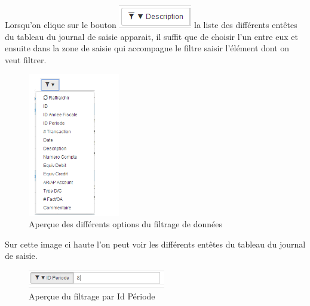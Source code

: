 \documentclass[12pt,a4paper]{report}
\begin{document}
Lorsqu'on clique sur le bouton  \includegraphics[scale=0.7]{pic/FiltrageData.png}  la liste des différents entêtes du tableau du journal de saisie apparait, il suffit que de choisir l'un entre eux et ensuite dans la zone de saisie qui accompagne le filtre saisir l'élément dont on veut filtrer.

\begin{figure}[h]
\begin{center}
\includegraphics[width=4cm]{pic/Menufiltrage.png}
\end{center}
\caption{Aperçue des différents options du filtrage de données}
\label{Aperçue des différents options du filtrage de données}
\end{figure}

Sur cette image ci haute l'on peut voir les différents entêtes du tableau du journal de saisie.

\begin{figure}[h]
\begin{center}
\includegraphics[width=6cm]{pic/FiltrageIdPeriode.png}
\end{center}
\caption{Aperçue du filtrage par Id Période}
\label{Aperçue du filtrage par Id Période}
\end{figure}
\end{document}
